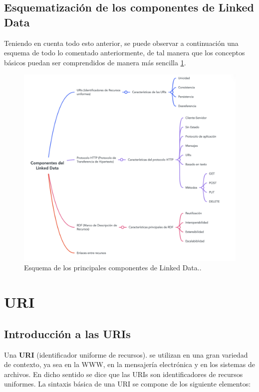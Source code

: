 \documentclass[11pt]{report}
\begin{document}
\section{Esquematización de los componentes de Linked Data}

Teniendo en cuenta todo esto anterior, se puede observar a continuación una esquema de todo lo comentado anteriormente, de tal manera que los conceptos básicos puedan ser comprendidos de manera más sencilla \ref{fig:Componentes-Linked-Data}.

\begin{figure}[H]
	\centering
	\includegraphics[scale=0.6]{../img/Componentes-Linked-Data.png}
	\caption{Esquema de los principales componentes de Linked Data..}
	\label{fig:Componentes-Linked-Data}
\end{figure}

\chapter{URI}

\section{Introducción a las URIs}

Una \textbf{URI} (identificador uniforme de recursos). se utilizan en una gran variedad de contexto, ya sea en la WWW, en la mensajería electrónica y en los sistemas de archivos. En dicho sentido se dice que las URIs son identificadores de recursos uniformes. La sintaxis básica de una URI se compone de los siguiente elementos:
\end{document}
